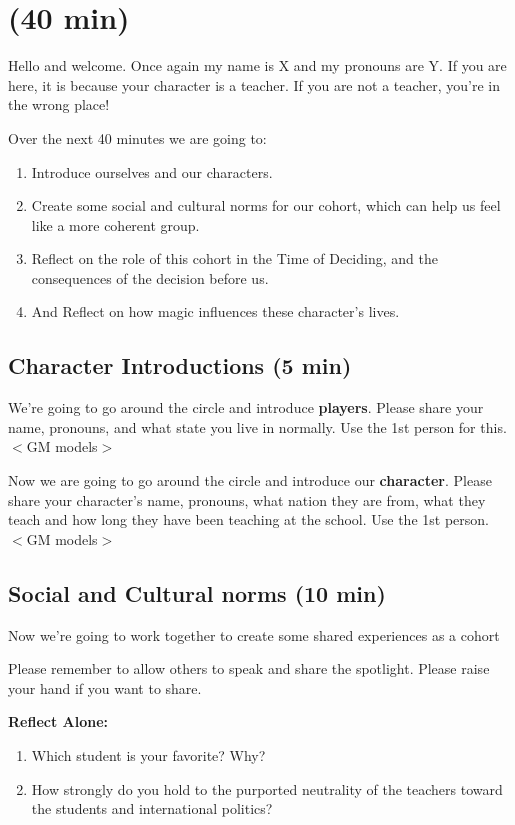 \documentclass[green]{GL2020}
\begin{document}
\name{\gPreGameTeacher{}}

\section*{(40 min)}

Hello and welcome. Once again my name is X and my pronouns are Y. If you are here, it is because your character is a teacher. If you are not a teacher, you're in the wrong place!

Over the next 40 minutes we are going to:
\begin{enumerate}
	\item Introduce ourselves and our characters.
	\item Create some social and cultural norms for our cohort, which can help us feel like a more coherent group.
	\item Reflect on the role of this cohort in the Time of Deciding, and the consequences of the decision before us.
	\item And Reflect on how magic influences these character’s lives.
\end{enumerate}

\subsection*{Character Introductions (5 min)}
We’re going to go around the circle and introduce \textbf{players}. Please share your name, pronouns, and what state you live in normally. Use the 1st person for this. $<$GM models$>$

Now we are going to go around the circle and introduce our \textbf{character}. Please share your character’s name, pronouns, what nation they are from, what they teach and how long they have been teaching at the school. Use the 1st person. $<$GM models$>$

\subsection*{Social and Cultural norms (10 min)}
Now we’re going to work together to create some shared experiences as a cohort

Please remember to allow others to speak and share the spotlight.  Please raise your hand if you want to share.

\textbf{Reflect Alone:}
\begin{enumerate}
	\item Which student is your favorite? Why?
	\item How strongly do you hold to the purported neutrality of the teachers toward the students and international politics?
\end{enumerate}
\end{document}
